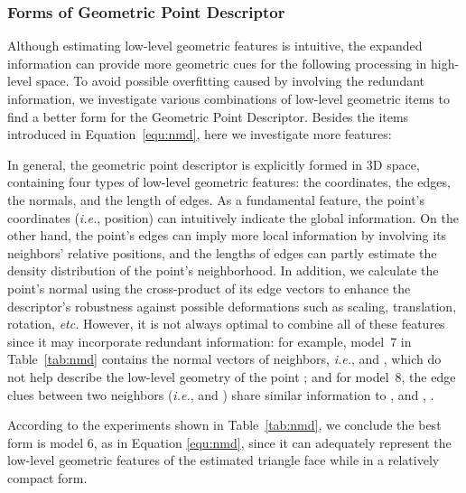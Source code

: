 \documentclass[journal,twoside]{IEEEtran}
\newcommand{\latinphrase}[1]{\textit{#1}}
\newcommand{\ie}{\latinphrase{i.e.}\xspace}
\newcommand{\etc}{\latinphrase{etc.}\xspace}
\begin{document}
\subsubsection{Forms of Geometric Point Descriptor}
\label{sec:exp_nmd}
Although estimating low-level geometric features is intuitive, the expanded information can provide more geometric cues for the following processing in high-level space. To avoid possible overfitting caused by involving the redundant information, we investigate various combinations of low-level geometric items to find a better form for the Geometric Point Descriptor. Besides the items introduced in Equation~\ref{equ:nmd}, here we investigate more features:

\begin{small}

\end{small}

In general, the geometric point descriptor is explicitly formed in 3D space, containing four types of low-level geometric features: the coordinates, the edges, the normals, and the length of edges. As a fundamental feature, the point's coordinates (\ie, position) can intuitively indicate the global information. On the other hand, the point's edges can imply more local information by involving its neighbors' relative positions, and the lengths of edges can partly estimate the density distribution of the point's neighborhood. In addition, we calculate the point's normal using the cross-product of its edge vectors to enhance the descriptor's robustness against possible deformations such as scaling, translation, rotation, \etc However, it is not always optimal to combine all of these features since it may incorporate redundant information: for example, model~7 in Table~\ref{tab:nmd} contains the normal vectors of neighbors, \ie,  and , which do not help describe the low-level geometry of the point ; and for model~8, the edge clues between two neighbors (\ie,  and ) share similar information to ,  and , .

According to the experiments shown in Table~\ref{tab:nmd}, we conclude the best form is model 6, as in Equation \ref{equ:nmd}, since it can adequately represent the low-level geometric features of the estimated triangle face while in a relatively compact form.
\end{document}
